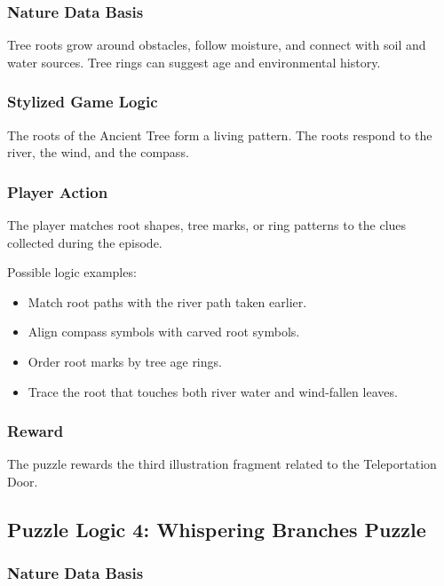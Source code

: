 \documentclass[12pt]{article}
\begin{document}
\subsubsection{Nature Data Basis}

Tree roots grow around obstacles, follow moisture, and connect with soil and water sources. Tree rings can suggest age and environmental history.

\subsubsection{Stylized Game Logic}

The roots of the Ancient Tree form a living pattern. The roots respond to the river, the wind, and the compass.

\subsubsection{Player Action}

The player matches root shapes, tree marks, or ring patterns to the clues collected during the episode.

Possible logic examples:

\begin{itemize}[leftmargin=*]
    \item Match root paths with the river path taken earlier.
    \item Align compass symbols with carved root symbols.
    \item Order root marks by tree age rings.
    \item Trace the root that touches both river water and wind-fallen leaves.
\end{itemize}

\subsubsection{Reward}

The puzzle rewards the third illustration fragment related to the Teleportation Door.

\subsection{Puzzle Logic 4: Whispering Branches Puzzle}

\subsubsection{Nature Data Basis}
\end{document}
